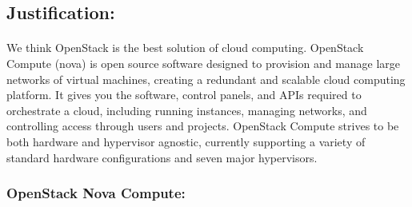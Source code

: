 \subsection{Justification:}
\paragraph{}We think OpenStack is the best solution of cloud computing. 
OpenStack Compute (nova) is open source software designed to provision and manage large networks of virtual machines, 
creating a redundant and scalable cloud computing platform. 
It gives you the software, control panels, 
and APIs required to orchestrate a cloud, including running instances, managing networks, and controlling access through users and projects. 
OpenStack Compute strives to be both hardware and hypervisor agnostic,
 currently supporting a variety of standard hardware configurations and seven major hypervisors.
\subsubsection{ OpenStack Nova Compute:}
